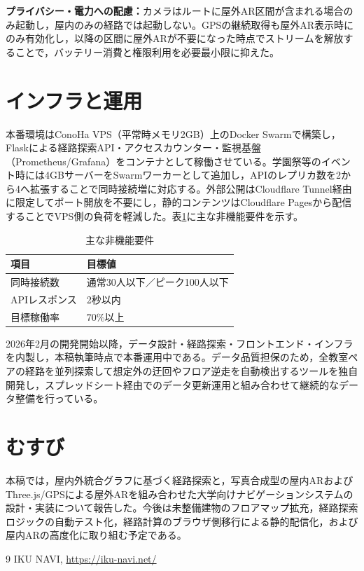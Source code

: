 \documentclass[a4paper,10.5pt,twocolumn]{ltjsarticle}
\begin{document}
\textbf{プライバシー・電力への配慮：}カメラはルートに屋外AR区間が含まれる場合のみ起動し，屋内のみの経路では起動しない。GPSの継続取得も屋外AR表示時にのみ有効化し，以降の区間に屋外ARが不要になった時点でストリームを解放することで，バッテリー消費と権限利用を必要最小限に抑えた。

\section{インフラと運用}

本番環境はConoHa VPS（平常時メモリ2GB）上のDocker Swarmで構築し，Flaskによる経路探索API・アクセスカウンター・監視基盤（Prometheus/Grafana）をコンテナとして稼働させている。学園祭等のイベント時には4GBサーバーをSwarmワーカーとして追加し，APIのレプリカ数を2から4へ拡張することで同時接続増に対応する。外部公開はCloudflare Tunnel経由に限定してポート開放を不要にし，静的コンテンツはCloudflare Pagesから配信することでVPS側の負荷を軽減した。表\ref{tab:req}に主な非機能要件を示す。

\begin{table}[t]
\centering
\small
\caption{主な非機能要件}
\label{tab:req}
\begin{tabular}{ll}
\toprule
項目 & 目標値 \\
\midrule
同時接続数 & 通常30人以下／ピーク100人以下 \\
APIレスポンス & 2秒以内 \\
目標稼働率 & 70\%以上 \\
\bottomrule
\end{tabular}
\end{table}

2026年2月の開発開始以降，データ設計・経路探索・フロントエンド・インフラを内製し，本稿執筆時点で本番運用中である。データ品質担保のため，全教室ペアの経路を並列探索して想定外の迂回やフロア逆走を自動検出するツールを独自開発し，スプレッドシート経由でのデータ更新運用と組み合わせて継続的なデータ整備を行っている。

\section{むすび}

本稿では，屋内外統合グラフに基づく経路探索と，写真合成型の屋内ARおよびThree.js/GPSによる屋外ARを組み合わせた大学向けナビゲーションシステムの設計・実装について報告した。今後は未整備建物のフロアマップ拡充，経路探索ロジックの自動テスト化，経路計算のブラウザ側移行による静的配信化，および屋内ARの高度化に取り組む予定である。

\begin{thebibliography}{9}
 IKU NAVI, \url{https://iku-navi.net/}
\end{thebibliography}
\end{document}
